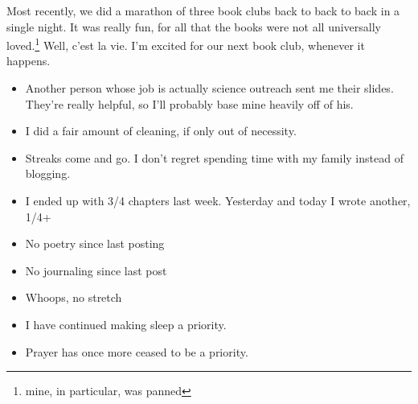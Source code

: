 \documentclass[12pt]{article}[titlepage]
\newcommand{\1}{\={a}}
\newcommand{\2}{\={e}}
\newcommand{\3}{\={\i}}
\newcommand{\4}{\=o}
\newcommand{\5}{\=u}
\newcommand{\6}{\={A}}
\renewcommand{\,}{\textsuperscript{,}}
\begin{document}
Most recently, we did a marathon of three book clubs back to back to back in a single night.
It was really fun, for all that the books were not all universally loved.\footnote{mine, in particular, was panned}
Well, c'est la vie.
I'm excited for our next book club, whenever it happens.

\begin{itemize}
\item Another person whose job is actually science outreach sent me their slides.
They're really helpful, so I'll probably base mine heavily off of his.
\item I did a fair amount of cleaning, if only out of necessity.
\item Streaks come and go.
I don't regret spending time with my family instead of blogging.
\item I ended up with 3/4 chapters last week.
Yesterday and today I wrote another, 1/4+
\item No poetry since last posting
\item No journaling since last post
\item Whoops, no stretch
\item I have continued making sleep a priority.
\item Prayer has once more ceased to be a priority.
\end{itemize}
\end{document}

